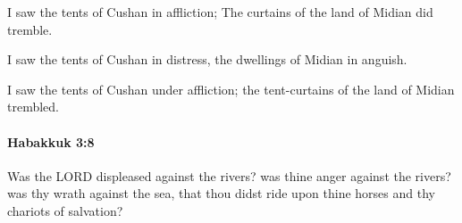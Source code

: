 			\begin{versebox}
					\item[BHS] 
					\item[LXX] 
					\item[ASV] I saw the tents of Cushan in affliction; The curtains of the land of Midian did tremble.
					\item[NIV] I saw the tents of Cushan in distress, the dwellings of Midian in anguish.
					\item[NRSV] I saw the tents of Cushan under affliction; the tent-curtains of the land of Midian trembled.
			\end{versebox}

		\paragraph{Habakkuk 3:8} %
			\label{HABAKKUK-3-8}

			Was the LORD displeased against the rivers? was thine anger against the rivers? was thy wrath against the sea, that thou didst ride upon thine horses and thy chariots of salvation?

